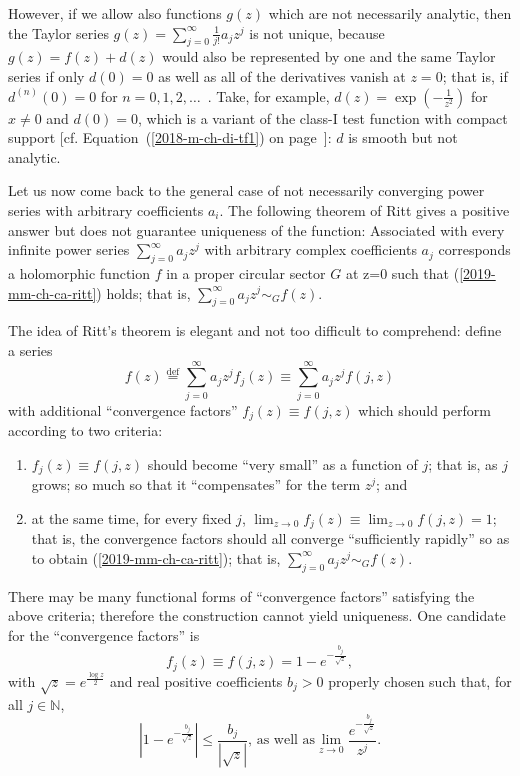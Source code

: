 However, if we allow also functions $g(z)$ which are not necessarily analytic, then
the Taylor series  $g(z) = \sum_{j=0}^\infty \frac{1}{j!}a_jz^j$ is not unique,
because $g(z) = f(z) + d(z)$ would also be represented by one and the same Taylor series if only
$d(0)=0$ as well as all of the derivatives vanish at $z=0$; that is, if
$d^{(n)}(0)=0$ for $n=0,1,2,\ldots$~.
Take, for example,
$d(z) = \exp\left({-\frac 1{z^2}}\right)$ for $x \neq 0$ and $d(0)=0$,
which is a variant of the class-I test function with compact support
[cf. Equation~(\ref{2018-m-ch-di-tf1}) on page~\pageref{2018-m-ch-di-tf1}]:
$d$ is smooth but not analytic.


Let us now come back to the general case of not necessarily converging power series with arbitrary
coefficients $a_i$.
The following theorem of Ritt
gives a positive answer but does not guarantee uniqueness of the function:
Associated with every infinite power series
$\sum_{j=0}^\infty a_j z^j$
with arbitrary complex coefficients $a_j$
corresponds a holomorphic function $f$ in a proper circular sector $G$ at z=0
such that (\ref{2019-mm-ch-ca-ritt}) holds; that is,
$ \sum_{j=0}^\infty a_j z^j  \sim_G  f(z) $.

The idea of Ritt's theorem is elegant and not too difficult to comprehend:
define a series
\begin{equation}
f(z)
\stackrel{\text{def}}{=}
 \sum_{j=0}^\infty a_j z^j f_j(z)  \equiv    \sum_{j=0}^\infty a_j z^j f(j,z)
 \end{equation}
with additional ``convergence factors'' $f_j(z) \equiv f(j,z)$
which should perform according to two criteria:
\begin{enumerate}
\item
$f_j(z)\equiv f(j,z)$ should become ``very small'' as a function of $j$; that is, as $j$ grows; so much so that it ``compensates'' for the term $z^j$; and
\item
at the same time, for every fixed $j$, $ \lim_{z\rightarrow 0} f_j(z)\equiv \lim_{z\rightarrow 0}  f(j,z) = 1$; that is, the
convergence factors should all converge ``sufficiently rapidly'' so as to obtain (\ref{2019-mm-ch-ca-ritt});
that is,  $ \sum_{j=0}^\infty a_j z^j  \sim_G  f(z) $.
\end{enumerate}

There may be many functional forms of ``convergence factors''
satisfying the above criteria; therefore the construction cannot yield uniqueness.
One candidate for the  ``convergence factors'' is
\begin{equation}
f_j(z) \equiv f(j,z)
= 1 - e^{-\frac{b_j}{\sqrt{z}}},
 \end{equation}
with
$\sqrt{z} = e^\frac{\log z}{2}$ and
real positive coefficients $b_j>0$ properly chosen such that,
for all $j\in \mathbb{N} $,
\begin{equation}
\left| 1 - e^{-\frac{b_j}{\sqrt{z}}}  \right|
\le
\frac{b_j}{   \left| \sqrt{z} \right|}\text{,
as  well as
}
\lim_{z\rightarrow 0} \frac{e^{-\frac{b_j}{\sqrt{z}}}}{z^j} .
\end{equation}

